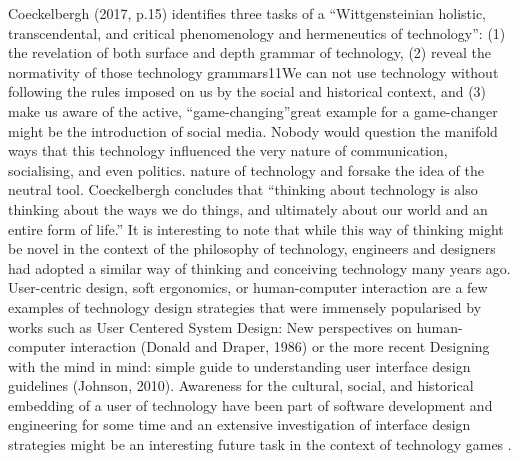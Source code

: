 Coeckelbergh (2017, p.15) identifies three tasks of a “Wittgensteinian
holistic, transcendental, and critical phenomenology and hermeneutics of
technology”: (1) the revelation of both surface and depth grammar of
technology, (2) reveal the normativity of those technology
grammars11We can not use technology without following the rules
imposed on us by the social and historical context, and (3) make us
aware of the active, “game-changing”\footnoteA great example for a
game-changer might be the introduction of social media. Nobody
would question the manifold ways that this technology influenced the
very nature of communication, socialising, and even politics. nature
of technology and forsake the idea of the neutral tool. Coeckelbergh
concludes that “thinking about technology is also thinking about the
ways we do things, and ultimately about our world and an entire form of
life.” It is interesting to note that while this way of thinking might
be novel in the context of the philosophy of technology, engineers and
designers had adopted a similar way of thinking and conceiving
technology many years ago. User-centric design, soft ergonomics, or
human-computer interaction are a few examples of technology design
strategies that were immensely popularised by works such as User
Centered System Design: New perspectives on human-computer interaction
(Donald and Draper, 1986) or the more recent Designing with the
mind in mind: simple guide to understanding user interface design
guidelines (Johnson, 2010). Awareness for the cultural, social, and
historical embedding of a user of technology have been part of software
development and engineering for some time and an extensive investigation
of interface design strategies might be an interesting future task in
the context of technology games .

